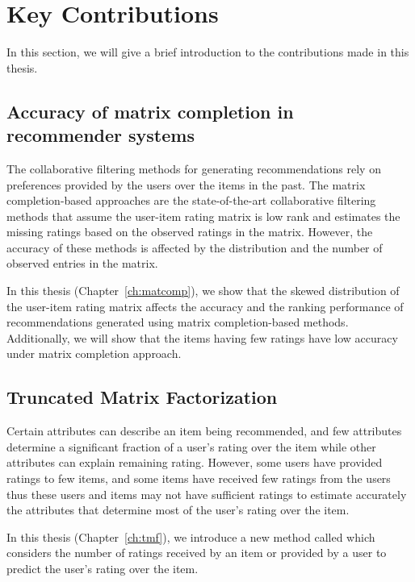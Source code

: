 \section{Key Contributions}
\label{ch:intro:contr}

In this section, we will give a brief introduction to the contributions made in this thesis. 


\subsection{Accuracy of matrix completion in recommender systems}
The collaborative filtering methods for generating recommendations rely on preferences
provided by the users over the items in the past. The matrix completion-based approaches
are the state-of-the-art collaborative filtering methods that assume the user-item
rating matrix is low rank and estimates the missing ratings based on the observed
ratings in the matrix. However, the accuracy of these methods is affected by the
distribution and the number of observed entries in the matrix.  

In this thesis (Chapter~\ref{ch:matcomp}), we show that the skewed distribution of the
user-item rating matrix affects the accuracy and the ranking performance of
recommendations generated using matrix completion-based methods. Additionally, we will
show that the items having few ratings have low accuracy under matrix completion approach.


\subsection{Truncated Matrix Factorization}
Certain attributes can describe an item being recommended, and few attributes
determine a significant fraction of a user's rating over the item while other
attributes can explain remaining rating. However, some users have provided ratings
to few items, and some items have received few ratings from the users thus these
users and items may not have sufficient ratings to estimate accurately the
attributes that determine most of the user's rating over the item.

In this thesis (Chapter~\ref{ch:tmf}), we introduce a new method called \TMF
which considers the number of ratings received by an item or provided by a user to predict the user's rating over the item. 


